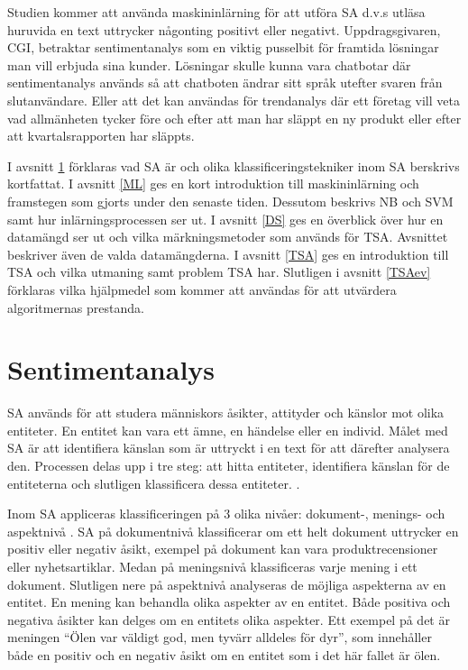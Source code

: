 \documentclass{kaumasters} %
\begin{document}
Studien kommer att använda maskininlärning för att utföra SA d.v.s utläsa huruvida en text uttrycker någonting positivt eller negativt. Uppdragsgivaren, CGI, betraktar sentimentanalys  som en viktig pusselbit för framtida lösningar man vill erbjuda sina kunder. Lösningar skulle kunna vara chatbotar där sentimentanalys används så att chatboten ändrar sitt språk utefter svaren från slutanvändare. Eller att det kan användas för trendanalys där ett företag vill veta vad allmänheten tycker före och efter att man har släppt en ny produkt eller efter att kvartalsrapporten har släppts.

I avsnitt \ref{SA} förklaras vad SA är och olika klassificeringstekniker inom SA berskrivs kortfattat. I avsnitt \ref{ML} ges en kort introduktion till maskininlärning och framstegen som gjorts under den senaste tiden. Dessutom beskrivs NB och SVM samt hur inlärningsprocessen ser ut. I avsnitt \ref{DS} ges en överblick över hur en datamängd ser ut och vilka märkningsmetoder som används för TSA. Avsnittet beskriver även de valda datamängderna. I avsnitt \ref{TSA} ges en introduktion till TSA och vilka utmaning samt problem TSA har. Slutligen i avsnitt \ref{TSAev} förklaras vilka hjälpmedel som kommer att användas för att utvärdera algoritmernas prestanda.


\section{Sentimentanalys} \label{SA}
SA används för att studera människors åsikter, attityder och känslor mot olika entiteter. En entitet kan vara ett ämne, en händelse eller en individ. Målet med SA är att identifiera känslan som är uttryckt i en text för att därefter analysera den. Processen delas upp i tre steg: att hitta entiteter, identifiera känslan för de entiteterna och slutligen klassificera dessa entiteter. \cite{SAsurvey}.

Inom SA appliceras klassificeringen på 3 olika nivåer: dokument-, menings- och aspektnivå \cite{SAsurvey}. SA på dokumentnivå klassificerar om ett helt dokument uttrycker en positiv eller negativ åsikt, exempel på dokument kan vara produktrecensioner eller nyhetsartiklar. Medan på meningsnivå klassificeras varje mening i ett dokument. Slutligen nere på aspektnivå analyseras de möjliga aspekterna av en entitet. En mening kan behandla olika aspekter av en entitet. Både positiva och negativa åsikter kan delges om en entitets olika aspekter. Ett exempel på det är meningen “Ölen var väldigt god, men tyvärr alldeles för dyr”, som innehåller både en positiv och en negativ åsikt om en entitet som i det här fallet är ölen.
\end{document}
